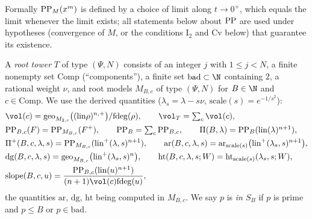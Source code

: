 \begin{remark}\label{pf:volthm:rem:limunder}
Formally $\mathrm{PP}_M(x^m)$ is defined by a choice of limit along $t\to0^+$, which equals the limit whenever
the limit exists; all statements below about $\mathrm{PP}$ are used under hypotheses (convergence of $M$, or
the conditions $\mathrm{I}_2$ and $\mathrm{Cv}$ below) that guarantee its existence.
\end{remark}

\begin{definition}\label{pf:volthm:def:tower}
A \emph{root tower} $T$ of type $(\Psi,N)$ consists of an integer $j$ with $1\le j<N$, a finite nonempty set
$\mathrm{Comp}$ (``components''), a finite set $\mathrm{bad}\subset\N$ containing $2$, a rational weight
$\nu$, and root models $M_{B,c}$ of type $(\Psi,N)$ for $B\in\N$ and $c\in\mathrm{Comp}$. We use the
derived quantities
($\lambda_s=\lambda-s\nu$, $\mathrm{scale}(s)=e^{-1/s^2}$):
\begin{align*}
&\vol(c)=\mathrm{geo}_{M_{2,c}}\bigl((\volthmlin\rho)^{n,+}\bigr)/\volthmfd(\rho),\qquad
  \vol_T=\textstyle\sum_c\vol(c),\\
&\volthmPP_{B,c}(F)=\volthmPP_{M_{B,c}}(F^+),\qquad \volthmPP_B=\textstyle\sum_c\volthmPP_{B,c},\qquad
  \Pi(B,\lambda)=\volthmPP_B(\volthmlin(\lambda)^{n+1}),\\
&\Pi^+(B,c,\lambda,s)=\volthmPP_{M_{B,c}}(\volthmlin^+(\lambda,s)^{n+1}),\qquad
  \mathrm{ar}(B,c,\lambda,s)=\mathrm{ar}_{\mathrm{scale}(s)}\bigl(\volthmlin^+(\lambda_s,s)^{n+1}\bigr),\\
&\mathrm{dg}(B,c,\lambda,s)=\mathrm{geo}_{M_{B,c}}\bigl(\volthmlin^+(\lambda_s,s)^n\bigr),\qquad
  \mathrm{ht}(B,c,\lambda,s;W)=\mathrm{ht}_{\mathrm{scale}(s)}(\lambda_s,s;W),\\
&\mathrm{slope}(B,c,u)=\frac{\volthmPP_{B,c}(\volthmlin(u)^{n+1})}{(n+1)\vol(c)\volthmfd(u)},
\end{align*}
the quantities $\mathrm{ar}$, $\mathrm{dg}$, $\mathrm{ht}$ being computed in $M_{B,c}$. We say $p$ is
\emph{in $S_B$} if $p$ is prime and $p\le B$ or $p\in\mathrm{bad}$.
\end{definition}

